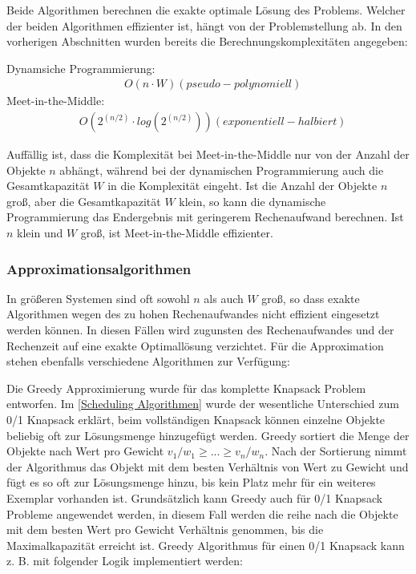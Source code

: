 Beide Algorithmen berechnen die exakte optimale Lösung des Problems. Welcher der beiden Algorithmen effizienter ist, hängt von der Problemstellung ab. In den vorherigen Abschnitten wurden bereits die Berechnungskomplexitäten angegeben:


    Dynamsiche Programmierung: \\
\begin{align}
    & O(n \cdot W) (pseudo-polynomiell)
    \label{EQ:DP}
\end{align}
    Meet-in-the-Middle: \\
\begin{align}
    & O(2^{(n/2)} \cdot log(2^{(n/2)})) (exponentiell-halbiert)
    \label{EQ:MitM}
\end{align}

Auffällig ist, dass die Komplexität bei Meet-in-the-Middle nur von der Anzahl der Objekte $ n $ abhängt, während bei der dynamischen Programmierung auch die Gesamtkapazität $ W $ in die Komplexität eingeht. Ist die Anzahl der Objekte $ n $ groß, aber die Gesamtkapazität $ W $ klein, so kann die dynamische Programmierung das Endergebnis mit geringerem Rechenaufwand berechnen. Ist $ n $ klein und $ W $ groß, ist Meet-in-the-Middle effizienter.

\subsubsection{Approximationsalgorithmen}
\label{Approximationsalgorithmen}

In größeren Systemen sind oft sowohl $ n $ als auch $ W $ groß, so dass exakte Algorithmen wegen des zu hohen Rechenaufwandes nicht effizient eingesetzt werden können. In diesen Fällen wird zugunsten des Rechenaufwandes und der Rechenzeit auf eine exakte Optimallösung verzichtet. Für die Approximation stehen ebenfalls verschiedene Algorithmen zur Verfügung:

Die Greedy Approximierung wurde für das komplette Knapsack Problem entworfen. Im \autoref{Scheduling Algorithmen} wurde der wesentliche Unterschied zum 0/1 Knapsack erklärt, beim vollständigen Knapsack können einzelne Objekte beliebig oft zur Lösungsmenge hinzugefügt werden. Greedy sortiert die Menge der Objekte nach Wert pro Gewicht $ v_1 / w_1 \geq ... \geq v_n / w_n $. Nach der Sortierung nimmt der Algorithmus das Objekt mit dem besten Verhältnis von Wert zu Gewicht und fügt es so oft zur Lösungsmenge hinzu, bis kein Platz mehr für ein weiteres Exemplar vorhanden ist. Grundsätzlich kann Greedy auch für 0/1 Knapsack Probleme angewendet werden, in diesem Fall werden die reihe nach die Objekte mit dem besten Wert pro Gewicht Verhältnis genommen, bis die Maximalkapazität erreicht ist. Greedy Algorithmus für einen 0/1 Knapsack kann z. B. mit folgender Logik implementiert werden:

